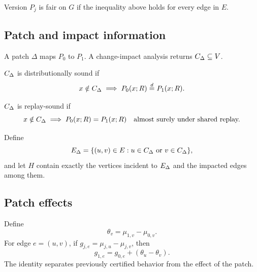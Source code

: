 \begin{definition}[Fairness on $G$]
Version $P_j$ is fair on $G$ if the inequality above holds for every edge in $E$.
\end{definition}

\subsection{Patch and impact information}
A patch $\Delta$ maps $P_0$ to $P_1$.  A change-impact analysis returns
$C_{\Delta}\subseteq V$.

\begin{definition}
$C_{\Delta}$ is distributionally sound if
\[
x\notin C_{\Delta}\implies P_0(x;R)\overset{d}=P_1(x;R).
\]
\end{definition}

\begin{definition}
$C_{\Delta}$ is replay-sound if
\[
x\notin C_{\Delta}\implies P_0(x;R)=P_1(x;R)
\quad\text{almost surely under shared replay.}
\]
\end{definition}

Define
\[
E_{\Delta}=\{(u,v)\in E:u\in C_{\Delta}\text{ or }v\in C_{\Delta}\},
\]
and let $H$ contain exactly the vertices incident to $E_{\Delta}$ and the impacted
edges among them.

\subsection{Patch effects}
Define
\[
\theta_v=\mu_{1,v}-\mu_{0,v}.
\]
For edge $e=(u,v)$, if $g_{j,e}=\mu_{j,u}-\mu_{j,v}$, then
\[
g_{1,e}=g_{0,e}+(\theta_u-\theta_v).
\]
The identity separates previously certified behavior from the effect of the patch.
